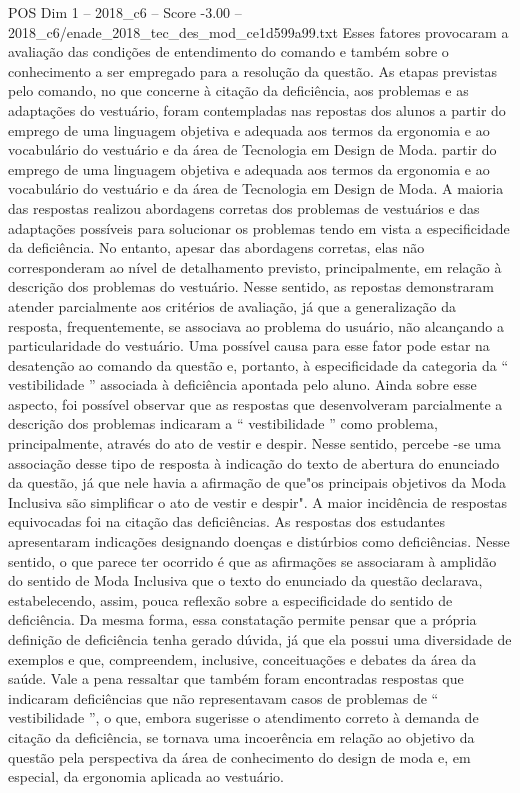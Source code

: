 \begin{textsample}{POS Dim 1 – 2018\_c6 – Score -3.00 – 2018\_c6/enade\_2018\_tec\_des\_mod\_ce1d599a99.txt}
Esses fatores provocaram a avaliação das condições de entendimento do comando e também sobre o conhecimento a ser empregado para a resolução da questão.
As etapas previstas pelo comando, no que concerne à citação da deficiência, aos problemas e as adaptações do vestuário, foram contempladas nas repostas dos alunos a partir do emprego de uma linguagem objetiva e adequada aos termos da ergonomia e ao vocabulário do vestuário e da área de Tecnologia em Design de Moda. partir do emprego de uma linguagem objetiva e adequada aos termos da ergonomia e ao vocabulário do vestuário e da área de Tecnologia em Design de Moda.
A maioria das respostas realizou abordagens corretas dos problemas de vestuários e das adaptações possíveis para solucionar os problemas tendo em vista a especificidade da deficiência.
No entanto, apesar das abordagens corretas, elas não corresponderam ao nível de detalhamento previsto, principalmente, em relação à descrição dos problemas do vestuário.
Nesse sentido, as repostas demonstraram atender parcialmente aos critérios de avaliação, já que a generalização da resposta, frequentemente, se associava ao problema do usuário, não alcançando a particularidade do vestuário.
Uma possível causa para esse fator pode estar na desatenção ao comando da questão e, portanto, à especificidade da categoria da “ vestibilidade ” associada à deficiência apontada pelo aluno.
Ainda sobre esse aspecto, foi possível observar que as respostas que desenvolveram parcialmente a descrição dos problemas indicaram a “ vestibilidade ” como problema, principalmente, através do ato de vestir e despir.
Nesse sentido, percebe -se uma associação desse tipo de resposta à indicação do texto de abertura do enunciado da questão, já que nele havia a afirmação de que"os principais objetivos da Moda Inclusiva são simplificar o ato de vestir e despir".
A maior incidência de respostas equivocadas foi na citação das deficiências.
As respostas dos estudantes apresentaram indicações designando doenças e distúrbios como deficiências.
Nesse sentido, o que parece ter ocorrido é que as afirmações se associaram à amplidão do sentido de Moda Inclusiva que o texto do enunciado da questão declarava, estabelecendo, assim, pouca reflexão sobre a especificidade do sentido de deficiência.
Da mesma forma, essa constatação permite pensar que a própria definição de deficiência tenha gerado dúvida, já que ela possui uma diversidade de exemplos e que, compreendem, inclusive, conceituações e debates da área da saúde.
Vale a pena ressaltar que também foram encontradas respostas que indicaram deficiências que não representavam casos de problemas de “ vestibilidade ”, o que, embora sugerisse o atendimento correto à demanda de citação da deficiência, se tornava uma incoerência em relação ao objetivo da questão pela perspectiva da área de conhecimento do design de moda e, em especial, da ergonomia aplicada ao vestuário.

\end{textsample}
